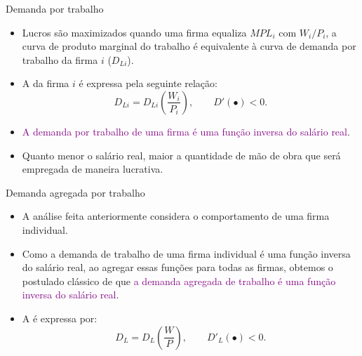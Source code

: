 \documentclass[10pt]{beamer}
\begin{document}
\begin{frame}{Demanda por trabalho}
    \begin{itemize}
        \item Lucros são maximizados quando uma firma equaliza $MPL_i$ com $W_i/P_i$, a curva de produto marginal do trabalho é equivalente à curva de demanda por trabalho da firma $i$ ($D_{Li}$).\bigskip

        \item A  da firma $i$ é expressa pela seguinte relação:
              \begin{equation}
                  D_{Li} = D_{Li}\left(\frac{W_i}{P_i}\right), \qquad D'(\bullet) < 0.
                  \label{eq7}
              \end{equation}\bigskip

        \item \textcolor{purple}{A demanda por trabalho de uma firma é uma função inversa do salário real}.\bigskip

        \item Quanto menor o salário real, maior a quantidade de mão de obra que será empregada de maneira lucrativa.
    \end{itemize}
\end{frame}

\begin{frame}{Demanda agregada por trabalho}
    \begin{itemize}
        \item A análise feita anteriormente considera o comportamento de uma firma individual.\bigskip

        \item Como a demanda de trabalho de uma firma individual é uma função inversa do salário real, ao agregar essas funções para todas as firmas, obtemos o postulado clássico de que \textcolor{purple}{a demanda agregada de trabalho é uma função inversa do salário real}.\bigskip

        \item A  é expressa por:
              \begin{equation}
                  D_L = D_L\left(\frac{W}{P}\right), \qquad D'_L(\bullet)<0.
              \end{equation}
    \end{itemize}
\end{frame}
\end{document}
